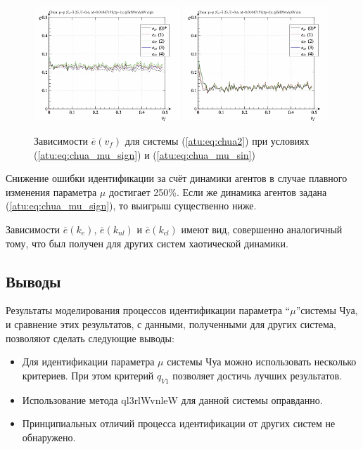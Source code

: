 \begin{figure}[htb!]
  \centerline{
    \includegraphics[width=0.49\textwidth]{p/cha/chua/ql3rlWvnAAW/chua_id-p_v_f_sign.png}
    \hfill
    \includegraphics[width=0.49\textwidth]{p/cha/chua/ql3rlWvnAAW/chua_id-p_v_f_sin.png}
  }
  \caption{Зависимости  $\overline{e}(v_f)$ для системы (\ref{atu:eq:chua2})
  при условиях (\ref{atu:eq:chua_mu_sign}) и (\ref{atu:eq:chua_mu_sin})
}
\label{atu:f:chua_e_v_f}
\end{figure}

Снижение ошибки идентификации за счёт динамики агентов
в случае плавного изменения параметра $\mu$ достигает 250\%.
Если же динамика агентов задана (\ref{atu:eq:chua_mu_sign}),
то выигрыш существенно ниже.

Зависимости
$\overline{e}(k_e)$,
$\overline{e}(k_{nl})$ и
$\overline{e}(k_{cl})$ имеют вид, совершенно аналогичный тому,
что был получен для других систем хаотической динамики.





\subsection{Выводы}  %

Результаты моделирования процессов идентификации параметра ``$\mu$''системы Чуа,
и сравнение этих результатов, с данными, полученными
для других система, позволяют сделать следующие выводы:

\begin{itemize}

  \item
    Для идентификации параметра $\mu$ системы Чуа
    можно использовать несколько критериев.
    При этом критерий $q_{V1}$ позволяет достичь лучших результатов.

  \item
    Использование метода  ql3rlWvnleW для данной системы
    оправданно.

  \item
    Принципиальных отличий процесса идентификации от других систем не обнаружено.

\end{itemize}





